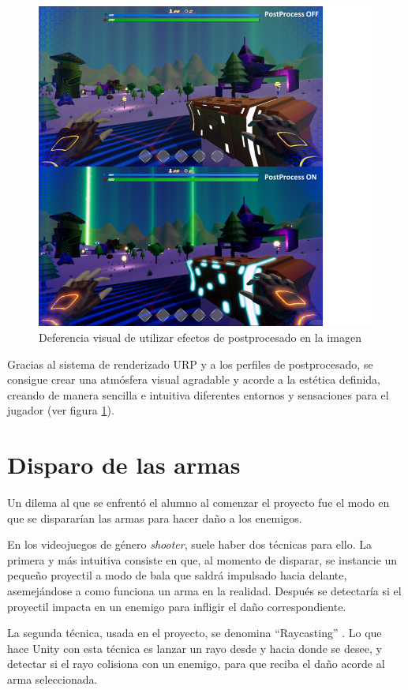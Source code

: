\begin{figure}[h]
	\centering
	\includegraphics[scale=0.45]{img/PostprocessComparison.png}
	\caption{Deferencia visual de utilizar efectos de postprocesado en la imagen}
	\label{fig:Postprocesado}
    \end{figure}
    Gracias al sistema de renderizado URP y a los perfiles de postprocesado, se consigue crear una atmósfera visual agradable y acorde a la estética definida, creando de manera sencilla e intuitiva diferentes entornos y sensaciones para el jugador (ver figura \ref{fig:Postprocesado}).

\section{Disparo de las armas}
Un dilema al que se enfrentó el alumno al comenzar el proyecto fue el modo en que se dispararían las armas para hacer daño a los enemigos.

En los videojuegos de género \textit{shooter}, suele haber dos técnicas para ello. La primera y más intuitiva consiste en que, al momento de disparar, se instancie un pequeño proyectil a modo de bala que saldrá impulsado hacia delante, asemejándose a como funciona un arma en la realidad. Después se detectaría si el proyectil impacta en un enemigo para infligir el daño correspondiente.

La segunda técnica, usada en el proyecto, se denomina ``Raycasting'' \cite{wiki:Raycast}. Lo que hace Unity con esta técnica es lanzar un rayo desde y hacia donde se desee, y detectar si el rayo colisiona con un enemigo, para que reciba el daño acorde al arma seleccionada.

